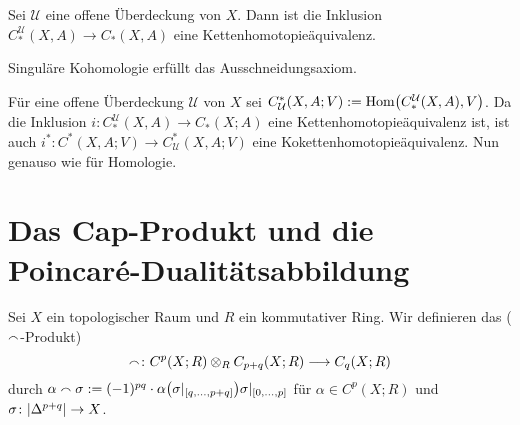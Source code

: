 \begin{korollarB}
	Sei $\mathcal{U}$ eine offene Überdeckung von $X$. Dann ist die Inklusion $C^{\mathcal{U}}_*(X,A) \to C_*(X,A)$ eine Kettenhomotopieäquivalenz.
\end{korollarB}

\begin{korollar}
	Singuläre Kohomologie erfüllt das Ausschneidungsaxiom.
\end{korollar}
\begin{beweis}
	Für eine offene Überdeckung $\mathcal{U}$ von $X$ sei $C^*_{\mathcal{U}}(X,A;V) := \Hom \enbrace*{C_*^{\mathcal{U}}(X,A),V}$. Da die Inklusion $i \colon C^{\mathcal{U}}_*(X,A) \to C_*(X;A)$ 
	eine Kettenhomotopieäquivalenz ist, ist auch $i^* \colon C^*(X,A;V) \to C^*_{\mathcal{U}}(X,A;V)$ eine Kokettenhomotopieäquivalenz. Nun genauso wie für Homologie.
\end{beweis}
\newpage

\section{Das Cap-Produkt und die Poincaré-Dualitätsabbildung} %
\label{sec:6}

\begin{definition}[{name=[Cap-Produkt]}]
	Sei $X$ ein topologischer Raum und $R$ ein kommutativer Ring. Wir definieren das  ($\smallfrown$-Produkt)
	\[
		\smallfrown \colon C^p(X;R) \otimes_R C_{p+q}(X;R) \longrightarrow C_q(X;R)
	\]
	durch $\alpha \capp \sigma := (-1)^{pq} \cdot \alpha \enbrace*{\sigma|_{\benbrace*{q,\ldots ,p+q}}} \sigma|_{\benbrace*{0,\ldots ,p}}$ für $\alpha \in C^p(X;R)$ und 
	$\sigma \colon \lvert\Delta^{p+q}\rvert\to X$.
\end{definition}

